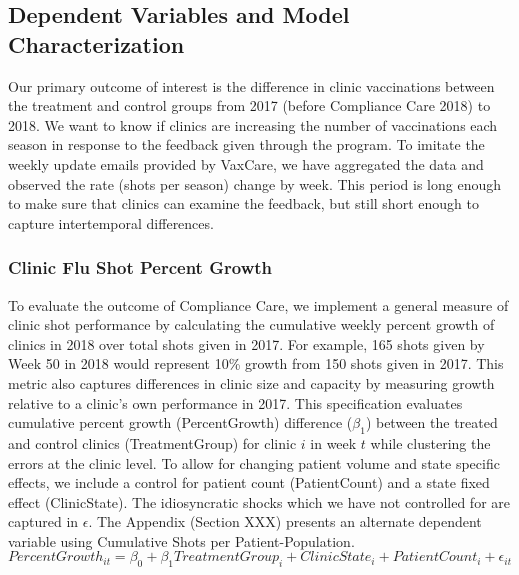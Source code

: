  \subsection{Dependent Variables and Model Characterization}
 Our primary outcome of interest is the difference in clinic vaccinations between the treatment and control groups from 2017 (before Compliance Care 2018) to 2018. We want to know if clinics are increasing the number of vaccinations each season in response to the feedback given through the program. To imitate the weekly update emails provided by VaxCare, we have aggregated the data and observed the rate (shots per season) change by week. This period is long enough to make sure that clinics can examine the feedback, but still short enough to capture intertemporal differences. 
 
 \subsubsection{Clinic Flu Shot Percent Growth} \label{emp_spec_pctGrowth}
 To evaluate the outcome of Compliance Care, we implement a general measure of clinic shot performance by calculating the cumulative weekly percent growth of clinics in 2018 over total shots given in 2017. For example, 165 shots given by Week 50 in 2018 would represent 10\% growth from 150 shots given in 2017. This metric also captures differences in clinic size and capacity by measuring growth relative to a clinic’s own performance in 2017. This specification evaluates cumulative percent growth (PercentGrowth) difference ($\beta_1$) between the treated and control clinics (TreatmentGroup) for clinic $i$ in week $t$ while clustering the errors at the clinic level. To allow for changing patient volume and state specific effects, we include a control for patient count (PatientCount) and a state fixed effect (ClinicState). The idiosyncratic shocks which we have not controlled for are captured in $\epsilon$. The Appendix (Section XXX) presents an alternate dependent variable using Cumulative Shots per Patient-Population.
  \begin{equation} %
       PercentGrowth_{it} = \beta_0 + \beta_1 TreatmentGroup_i + ClinicState_i + PatientCount_i + \epsilon_{it} 
  \end{equation}
 
